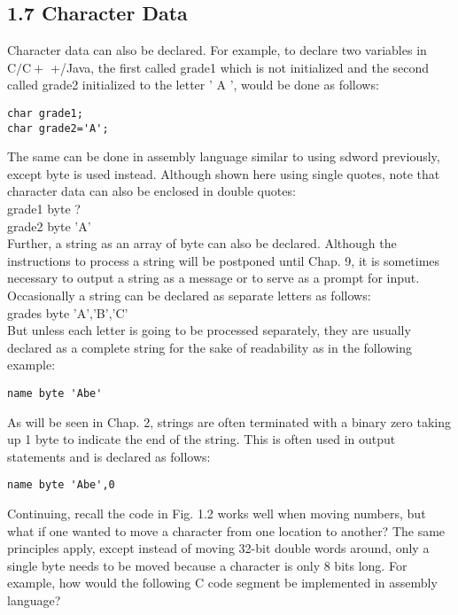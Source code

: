 \documentclass[10pt]{article}
\begin{document}
\subsection*{1.7 Character Data}
Character data can also be declared. For example, to declare two variables in $\mathrm{C} / \mathrm{C}+$ +/Java, the first called grade1 which is not initialized and the second called grade2 initialized to the letter ' A ', would be done as follows:

\begin{verbatim}
char grade1;
char grade2='A';
\end{verbatim}

The same can be done in assembly language similar to using sdword previously, except byte is used instead. Although shown here using single quotes, note that character data can also be enclosed in double quotes:\\
grade1 byte ?\\
grade2 byte 'A'\\
Further, a string as an array of byte can also be declared. Although the instructions to process a string will be postponed until Chap. 9, it is sometimes necessary to output a string as a message or to serve as a prompt for input. Occasionally a string can be declared as separate letters as follows:\\
grades byte 'A','B','C'\\
But unless each letter is going to be processed separately, they are usually declared as a complete string for the sake of readability as in the following example:

\begin{verbatim}
name byte 'Abe'
\end{verbatim}

As will be seen in Chap. 2, strings are often terminated with a binary zero taking up 1 byte to indicate the end of the string. This is often used in output statements and is declared as follows:

\begin{verbatim}
name byte 'Abe',0
\end{verbatim}

Continuing, recall the code in Fig. 1.2 works well when moving numbers, but what if one wanted to move a character from one location to another? The same principles apply, except instead of moving 32-bit double words around, only a single byte needs to be moved because a character is only 8 bits long. For example, how would the following C code segment be implemented in assembly language?
\end{document}

